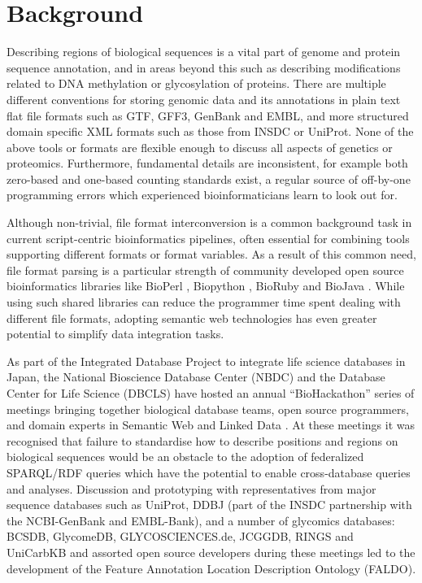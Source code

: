 \section*{Background}
Describing regions of biological sequences is a vital part of genome and protein sequence
annotation, and in areas beyond this such as describing modifications related to DNA methylation
or glycosylation of proteins.
There are multiple different conventions for storing genomic data and its annotations in
plain text flat file formats such as GTF, GFF3, GenBank and EMBL,
and more structured domain specific XML formats such as those from INSDC or UniProt.
None of the above tools or formats are flexible enough to discuss all aspects of genetics or proteomics. 
Furthermore, fundamental details are inconsistent, for example both zero-based and
one-based counting standards exist, a regular source of off-by-one programming
errors which experienced bioinformaticians learn to look out for.

Although non-trivial, file format interconversion is a common background task
in current script-centric bioinformatics pipelines, often essential for combining
tools supporting different formats or format variables.
As a result of this common need, file format parsing is a particular strength of
community developed open source bioinformatics libraries like BioPerl
\cite{BioPerl2002}, Biopython \cite{Biopython2009}, BioRuby \cite{BioRuby2010}
and BioJava \cite{BioJava2012}. While using such shared libraries can reduce the
programmer time spent dealing with different file formats, adopting semantic
web technologies has even greater potential to simplify data integration tasks.

As part of the Integrated Database Project to integrate life science databases in
Japan, the National Bioscience Database Center (NBDC) and the Database
Center for Life Science (DBCLS) have hosted an annual ``BioHackathon'' series
of meetings bringing together biological database teams, open source programmers,
and domain experts in Semantic Web and Linked Data \cite{BioHack2010,BioHack2011and2012}.
At these meetings it was recognised that failure to standardise how to describe positions
and regions on biological sequences would be an obstacle to the adoption of federalized
SPARQL/RDF queries which have the potential to enable cross-database queries and
analyses. Discussion and prototyping with representatives from major sequence databases
such as UniProt\cite{UniProt2013}, DDBJ\cite{DDBJ2013} (part of the INSDC partnership with the NCBI-GenBank\cite{GenBank2013} and EMBL-Bank\cite{ENA2013}),
and a number of glycomics databases: 
BCSDB\cite{doi:10.1021/ci100150d}, GlycomeDB\cite{Ranzinger01012011}, GLYCOSCIENCES.de\cite{Lutteke01052006}, JCGGDB, RINGS\cite{RINGS} and UniCarbKB and assorted open source developers during these meetings
led to the development of the Feature Annotation Location Description Ontology (FALDO).

